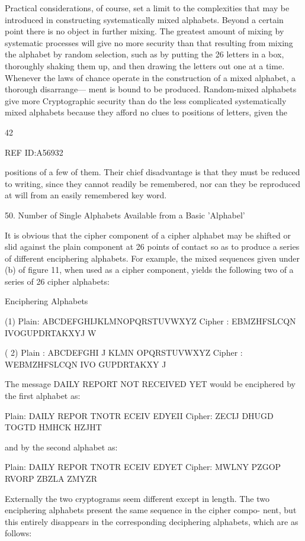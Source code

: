 {{Practical considerations, of course, set a limit to the complexities that
may be introduced in constructing systematically mixed alphabets.
Beyond a certain point there is no object in further mixing. The greatest
amount of mixing by systematic processes will give no more security
than that resulting from mixing the alphabet by random selection, such
as by putting the 26 letters in a box, thoroughly shaking them up, and
then drawing the letters out one at a time. Whenever the laws of chance
operate in the construction of a mixed alphabet, a thorough disarrange—
ment is bound to be produced. Random-mixed alphabets give more
Cryptographic security than do the less complicated systematically mixed
alphabets because they afford no clues to positions of letters, given the

42

REF ID:A56932

positions of a few of them. Their chief disadvantage is that they must be
reduced to writing, since they cannot readily be remembered, nor can
they be reproduced at will from an easily remembered key word.

50. Number of Single Alphabets Available from a Basic 'Alphabel'

It is obvious that the cipher component of a cipher alphabet may be
shifted or slid against the plain component at 26 points of contact so as
to produce a series of different enciphering alphabets. For example, the
mixed sequences given under (b) of ﬁgure 11, when used as a cipher
component, yields the following two of a series of 26 cipher alphabets:

Enciphering Alphabets

(1) Plain: ABCDEFGHIJKLMNOPQRSTUVWXYZ
Cipher : EBMZHFSLCQN IVOGUPDRTAKXYJ W

( 2) Plain : ABCDEFGHI J KLMN OPQRSTUVWXYZ
Cipher : WEBMZHFSLCQN IVO GUPDRTAKXY J

The message DAILY REPORT NOT RECEIVED YET would be
enciphered by the ﬁrst alphabet as:

Plain: DAILY REPOR TNOTR ECEIV EDYEII
Cipher: ZECIJ DHUGD TOGTD HMHCK HZJHT

and by the second alphabet as:

Plain: DAILY REPOR TNOTR ECEIV EDYET
Cipher: MWLNY PZGOP RVORP ZBZLA ZMYZR

Externally the two cryptograms seem different except in length. The two
enciphering alphabets present the same sequence in the cipher compo-
nent, but this entirely disappears in the corresponding deciphering
alphabets, which are as follows:

}}
